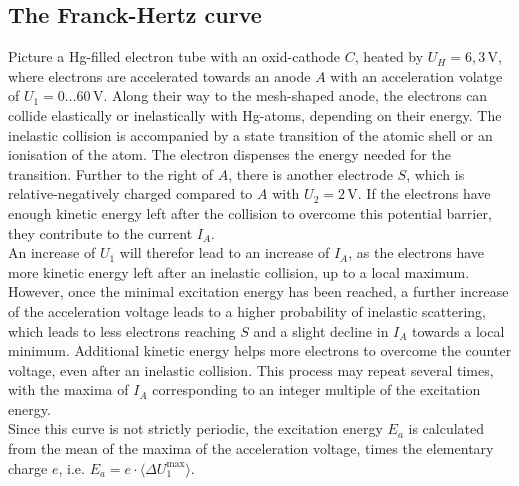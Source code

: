 \documentclass[a4paper,12pt]{article}
\newcommand{\bra}{}
\newcommand{\tecxt}{}
\begin{document}
\subsection{The Franck-Hertz curve}
Picture a Hg-filled electron tube with an oxid-cathode $C$, heated by $U_H=6,3\,$V, where electrons are accelerated towards an anode $A$  with an acceleration volatge of $U_1=0\dots 60\,$V. Along their way to the mesh-shaped anode, the electrons can collide elastically or inelastically with Hg-atoms, depending on their energy. The inelastic collision is accompanied by a state transition of the atomic shell or an ionisation of the atom. The electron dispenses the energy needed for the transition. Further to the right of $A$, there is another electrode $S$, which is relative-negatively charged compared to $A$ with $U_2=2\,$V. If the electrons have enough kinetic energy left after the collision to overcome this potential barrier, they contribute to the current $I_A$. \\
An increase of $U_1$ will therefor lead to an increase of $I_A$, as the electrons have more kinetic energy left after an inelastic collision, up to a local maximum. However, once the minimal excitation energy has been reached, a further increase of the acceleration voltage leads to a higher probability of inelastic scattering, which leads to less electrons reaching $S$ and a slight decline in $I_A$ towards a local minimum. Additional kinetic energy helps more electrons to overcome the counter voltage, even after an inelastic collision. This process may repeat several times, with the maxima of $I_A$ corresponding to an integer multiple of the excitation energy. \\
Since this curve is not strictly periodic, the excitation energy $E_a$ is calculated from the mean of the maxima of the acceleration voltage, times the elementary charge $e$, i.e. $E_a=e\cdot\bra\langle {\Delta U_1^{\tecxt\text{max}}}\rangle$.
\end{document}
